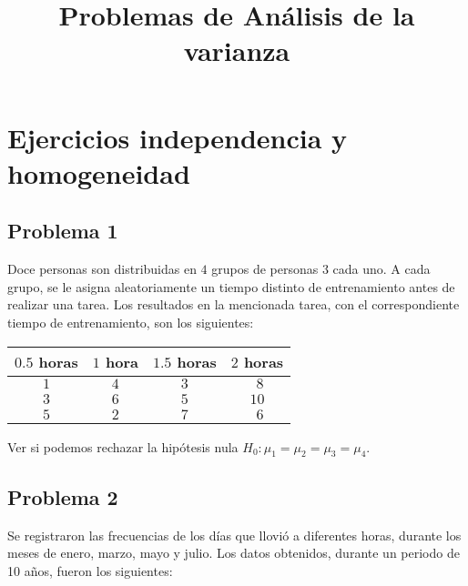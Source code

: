 \documentclass[
]{article}
\title{Problemas de Análisis de la varianza}
\author{}
\date{\vspace{-2.5em}}
\begin{document}
\maketitle

{
\hypersetup{linkcolor=blue}
\setcounter{tocdepth}{4}
\tableofcontents
}
\hypertarget{ejercicios-independencia-y-homogeneidad}{%
\section{Ejercicios independencia y
homogeneidad}\label{ejercicios-independencia-y-homogeneidad}}

\hypertarget{problema-1}{%
\subsection{Problema 1}\label{problema-1}}

Doce personas son distribuidas en \(4\) grupos de personas \(3\) cada
uno. A cada grupo, se le asigna aleatoriamente un tiempo distinto de
entrenamiento antes de realizar una tarea. Los resultados en la
mencionada tarea, con el correspondiente tiempo de entrenamiento, son
los siguientes:

\begin{center}
\begin{tabular}{|c|c|c|c|}
\hline
$0.5$ horas&$1$ hora&$1.5$ horas&$2$ horas\\\hline\hline
$1$&$4$&$3$&$\ \,8$\\\hline
$3$&$6$&$5$&$10$\\\hline
$5$&$2$&$7$&$\ \,6$\\\hline
\end{tabular}
\end{center}

Ver si podemos rechazar la hipótesis nula
\(H_0:\mu_1=\mu_2=\mu_3=\mu_4.\)

\hypertarget{problema-2}{%
\subsection{Problema 2}\label{problema-2}}

Se registraron las frecuencias de los días que llovió a diferentes
horas, durante los meses de enero, marzo, mayo y julio. Los datos
obtenidos, durante un periodo de 10 años, fueron los siguientes:
~\newline
\end{document}
